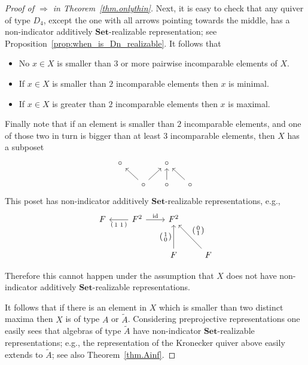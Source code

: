 \documentclass[a4paper]{amsart}
\theoremstyle{plain}
\theoremstyle{definition}
\theoremstyle{remark}
\newcommand{\Set}{\mathbf{Set}}
\begin{document}
\begin{proof}[Proof of \( \Rightarrow \) in Theorem~\ref{thm.onlythin}]
Next, it is easy to check that any quiver of type \( D_4 \), except the one with all arrows pointing towards the middle, has a non-indicator  additively \( \Set \)-realizable representation; see  Proposition~\ref{prop:when_is_Dn_realizable}. It follows that
\begin{itemize}
\item No \( x  \in X \) is smaller than \( 3 \) or more pairwise incomparable elements of \( X \).
\item If \( x \in X \) is smaller than \( 2 \) incomparable elements then \( x \) is minimal.
\item If \( x \in X \) is greater than \( 2 \) incomparable elements then \( x \) is maximal.
\end{itemize}
Finally note that if an element is smaller than \( 2 \) incomparable elements, and one of those two in turn is bigger than at least \( 3 \) incomparable elements, then \( X \) has a subposet
\[ \begin{tikzcd}[column sep=5mm,row sep=5mm]
\circ && \circ \\
& \circ \ar[lu] \ar[ru] & \circ \ar[u] & \circ \ar[lu]
\end{tikzcd} \]
This poset has non-indicator additively \( \Set \)-realizable representations, e.g.,
\[ \begin{tikzcd}[column sep=8mm,row sep=10mm,ampersand replacement=\&]
F \& F^2  \ar[l, "\left({\begin{smallmatrix}1 & 1\end{smallmatrix}}\right)"] \ar[r, "\text{id}"]\&  F^2 \\
\& \& F \ar[u,"\left({\begin{smallmatrix}1 \\ 0 \end{smallmatrix}}\right)"] \& F \ar[lu,swap,"\left({\begin{smallmatrix}0 \\ 1\end{smallmatrix}}\right)"]
\end{tikzcd} \]

Therefore this cannot happen under the assumption that \( X \) does not have non-indicator additively \( \Set \)-realizable representations.

It follows that if there is an element in \( X \) which is smaller than two distinct maxima then \( X \) is of type \( A \) or \( \widetilde{A} \). Considering preprojective representations one easily sees that algebras of type \( \widetilde{A} \) have non-indicator \( \Set \)-realizable representations; e.g., the representation of the Kronecker quiver above easily extends to $\widetilde{A}$; see also Theorem~\ref{thm.Ainf}.


\end{proof}
\end{document}
